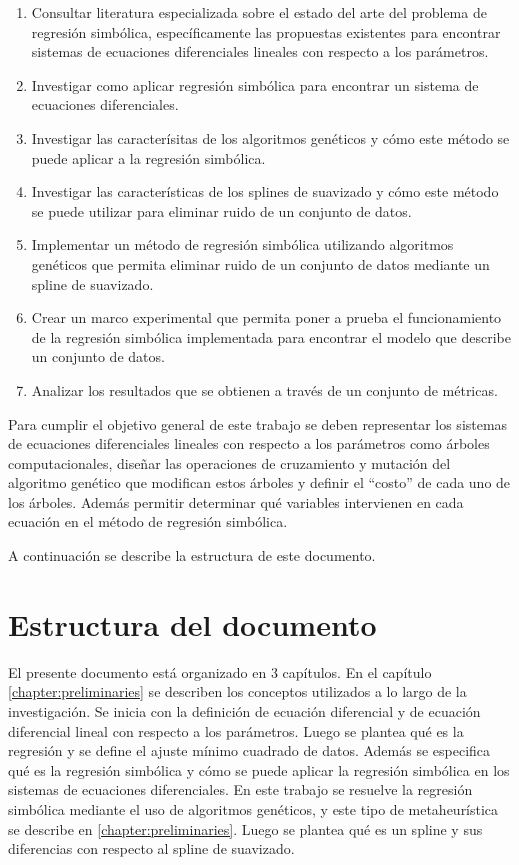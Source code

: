 \begin{enumerate}
    \item Consultar literatura especializada sobre el estado del arte del problema de regresión simbólica, específicamente las propuestas existentes para encontrar sistemas de ecuaciones diferenciales lineales con respecto a los parámetros.
    \item Investigar como aplicar regresión simbólica para encontrar un sistema de ecuaciones diferenciales.
    \item Investigar las caracterísitas de los algoritmos genéticos y cómo este método se puede aplicar a la regresión simbólica.
    \item Investigar las características de los splines de suavizado y cómo este método se puede utilizar para eliminar ruido de un conjunto de datos.
    \item Implementar un método de regresión simbólica utilizando algoritmos genéticos que permita eliminar ruido de un conjunto de datos mediante un spline de suavizado.
    \item Crear un marco experimental que permita poner a prueba el funcionamiento de la regresión simbólica implementada para encontrar el modelo que describe un conjunto de datos.
    \item Analizar los resultados que se obtienen a través de un conjunto de métricas.
\end{enumerate}

Para cumplir el objetivo general de este trabajo se deben representar los sistemas de ecuaciones diferenciales lineales con respecto a los parámetros como árboles computacionales, diseñar las operaciones de cruzamiento y mutación del algoritmo genético que modifican estos árboles y definir el ``costo'' de cada uno de los árboles. Además permitir determinar qué variables intervienen en cada ecuación en el método de regresión simbólica.

A continuación se describe la estructura de este documento.

\section*{Estructura del documento}

El presente documento está organizado en 3 capítulos. En el capítulo \ref{chapter:preliminaries} se describen los conceptos utilizados a lo largo de la investigación. Se inicia con la definición de ecuación diferencial y de ecuación diferencial lineal con respecto a los parámetros. Luego se plantea qué es la regresión y se define el ajuste mínimo cuadrado de datos. Además se especifica qué es la regresión simbólica y cómo se puede aplicar la regresión simbólica en los sistemas de ecuaciones diferenciales. En este trabajo se resuelve la regresión simbólica mediante el uso de algoritmos genéticos, y este tipo de metaheurística se describe en \ref{chapter:preliminaries}. Luego se plantea qué es un spline y sus diferencias con respecto al spline de suavizado.

